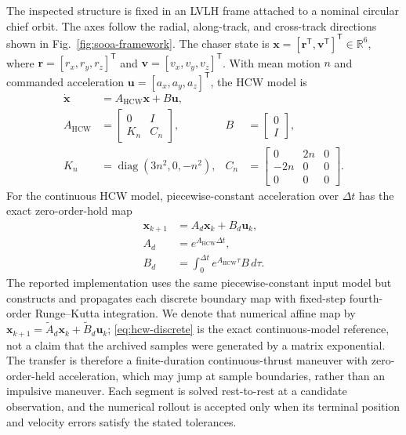 \documentclass{IEEEtaes}
\newcommand{\R}{\mathbb{R}}
\newcommand{\dt}{\Delta t}
\theoremstyle{remark}
\theoremstyle{plain}
\begin{document}
The inspected structure is fixed in an LVLH frame attached to a nominal circular chief orbit. The axes follow the radial, along-track, and cross-track directions shown in Fig.~\ref{fig:sooa-framework}. The chaser state is $\mathbf{x}=[\mathbf{r}^{\mathsf T},\mathbf{v}^{\mathsf T}]^{\mathsf T}\in\R^6$, where $\mathbf r=[r_x,r_y,r_z]^{\mathsf T}$ and $\mathbf v=[v_x,v_y,v_z]^{\mathsf T}$. With mean motion $n$ and commanded acceleration $\mathbf{u}=[a_x,a_y,a_z]^{\mathsf T}$, the HCW model is
\begin{equation}
  \begin{aligned}
  \dot{\mathbf{x}}&=A_{\mathrm{HCW}}\mathbf{x}+B\mathbf{u},\\
  A_{\mathrm{HCW}}&=\begin{bmatrix}0&I\\K_n&C_n\end{bmatrix},
  &B&=\begin{bmatrix}0\\I\end{bmatrix},\\
  K_n&=\operatorname{diag}(3n^2,0,-n^2),
  &C_n&=\begin{bmatrix}0&2n&0\\-2n&0&0\\0&0&0\end{bmatrix}.
  \end{aligned}
  \label{eq:hcw-continuous}
\end{equation}
For the continuous HCW model, piecewise-constant acceleration over $\dt$ has the exact zero-order-hold map
\begin{equation}
  \begin{aligned}
  \mathbf{x}_{k+1}&=A_d\mathbf{x}_k+B_d\mathbf{u}_k,\\
  A_d&=e^{A_{\mathrm{HCW}}\dt},\\
  B_d&=\int_0^{\dt}e^{A_{\mathrm{HCW}}\tau}B\,d\tau.
  \end{aligned}
  \label{eq:hcw-discrete}
\end{equation}
The reported implementation uses the same piecewise-constant input model but constructs and propagates each discrete boundary map with fixed-step fourth-order Runge--Kutta integration. We denote that numerical affine map by $\mathbf x_{k+1}=\widetilde A_d\mathbf x_k+\widetilde B_d\mathbf u_k$; \eqref{eq:hcw-discrete} is the exact continuous-model reference, not a claim that the archived samples were generated by a matrix exponential. The transfer is therefore a finite-duration continuous-thrust maneuver with zero-order-held acceleration, which may jump at sample boundaries, rather than an impulsive maneuver. Each segment is solved rest-to-rest at a candidate observation, and the numerical rollout is accepted only when its terminal position and velocity errors satisfy the stated tolerances.
\end{document}
